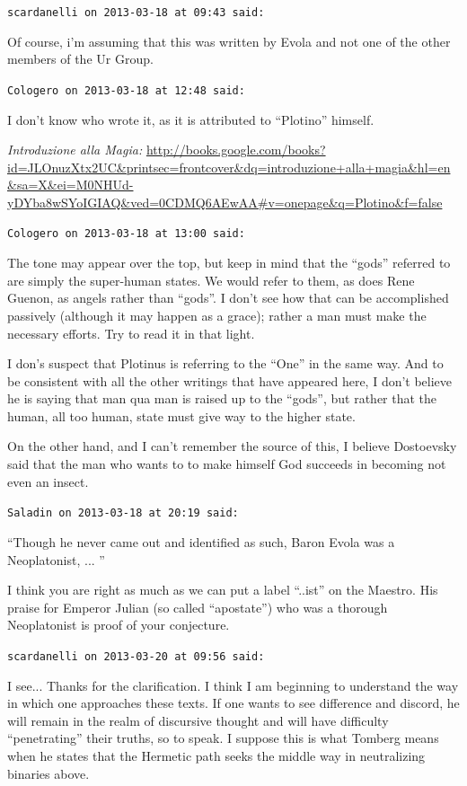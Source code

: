 \begin{footnotesize}
\begin{sffamily}
\hfill

\texttt{scardanelli on 2013-03-18 at 09:43 said:}

Of course, i'm assuming that this was written by Evola and not one of the other members of the Ur Group.

\hfill

\texttt{Cologero on 2013-03-18 at 12:48 said:}

I don't know who wrote it, as it is attributed to ``Plotino'' himself.

\textit{Introduzione alla Magia:} \url{http://books.google.com/books?id=JLOnuzXtx2UC\&printsec=frontcover\&dq=introduzione+alla+magia\&hl=en\&sa=X\&ei=M0NHUd-yDYba8wSYoIGIAQ\&ved=0CDMQ6AEwAA\#v=onepage\&q=Plotino\&f=false}

\hfill

\texttt{Cologero on 2013-03-18 at 13:00 said:}

The tone may appear over the top, but keep in mind that the ``gods'' referred to are simply the super-human states. We would refer to them, as does Rene Guenon, as angels rather than ``gods''. I don't see how that can be accomplished passively (although it may happen as a grace); rather a man must make the necessary efforts. Try to read it in that light.

I don's suspect that Plotinus is referring to the ``One'' in the same way. And to be consistent with all the other writings that have appeared here, I don't believe he is saying that man qua man is raised up to the ``gods'', but rather that the human, all too human, state must give way to the higher state.

On the other hand, and I can't remember the source of this, I believe Dostoevsky said that the man who wants to to make himself God succeeds in becoming not even an insect.

\hfill

\texttt{Saladin on 2013-03-18 at 20:19 said:}

``Though he never came out and identified as such, Baron Evola was a Neoplatonist, ... ''

I think you are right as much as we can put a label ``..ist'' on the Maestro. His praise for Emperor Julian (so called ``apostate'') who was a thorough Neoplatonist is proof of your conjecture.

\hfill

\texttt{scardanelli on 2013-03-20 at 09:56 said:}

I see... Thanks for the clarification. I think I am beginning to understand the way in which one approaches these texts. If one wants to see difference and discord, he will remain in the realm of discursive thought and will have difficulty ``penetrating'' their truths, so to speak. I suppose this is what Tomberg means when he states that the Hermetic path seeks the middle way in neutralizing binaries above.


\end{sffamily}
\end{footnotesize}
